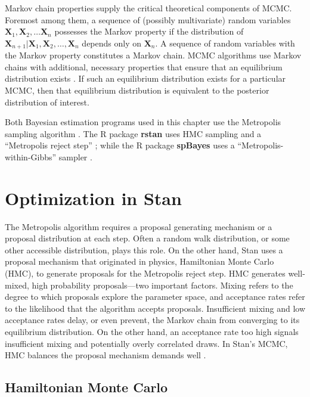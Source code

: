 Markov chain properties supply the critical theoretical components of MCMC. Foremost among them, a sequence of (possibly multivariate) random variables $\pmb{X}_{1}, \pmb{X}_{2}, \hdots \pmb{X}_{n}$ possesses the Markov property if the distribution of $\pmb{X}_{n+1}|\pmb{X}_{1}, \pmb{X}_{2}, \hdots , \pmb{X}_{n}$ depends only on $\pmb{X}_{n}$. A sequence of random variables with the Markov property constitutes a Markov chain. MCMC algorithms use Markov chains with additional, necessary properties that ensure that an equilibrium distribution exists \citep{Brooks2011}. If such an equilibrium distribution exists for a particular MCMC, then that equilibrium distribution is equivalent to the posterior distribution of interest.

Both Bayesian estimation programs used in this chapter use the Metropolis sampling algorithm \citep{Metropolis1953}. The R package {\bf rstan} uses HMC sampling and a ``Metropolis reject step'' \citep{rstan}; while the R package {\bf spBayes} uses a ``Metropolis-within-Gibbs'' sampler \citep{Finley2013}. 

\section{Optimization in Stan} \label{stanopt} %

The Metropolis algorithm requires a proposal generating mechanism or a proposal distribution at each step. Often a random walk distribution, or some other accessible distribution, plays this role. On the other hand, Stan uses a proposal mechanism that originated in physics, Hamiltonian Monte Carlo (HMC), to generate proposals for the Metropolis reject step. HMC generates well-mixed, high probability proposals---two important factors. Mixing refers to the degree to which proposals explore the parameter space, and acceptance rates refer to the likelihood that the algorithm accepts proposals. Insufficient mixing and low acceptance rates delay, or even prevent, the Markov chain from converging to its equilibrium distribution. On the other hand, an acceptance rate too high signals insufficient mixing and potentially overly correlated draws. In Stan's MCMC, HMC balances the proposal mechanism demands well \citep{Neal2011}. 

\subsection{Hamiltonian Monte Carlo} 

